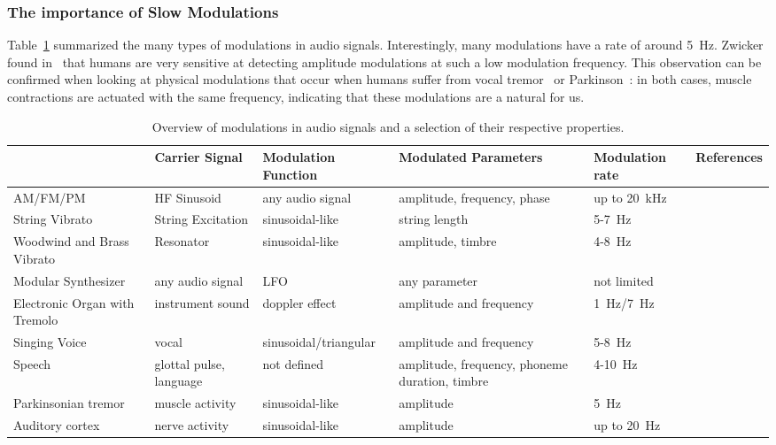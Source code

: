 \subsubsection*{The importance of Slow Modulations}

Table~\ref{tab:modulations} summarized the many types of modulations in audio signals.
Interestingly, many modulations have a rate of around 5~\si{\hertz}. 
Zwicker found in~\cite{zwicker52} that humans are very sensitive at detecting amplitude modulations at such a low modulation frequency.
This observation can be confirmed when looking at physical modulations that occur when humans suffer from vocal tremor~\cite{ramig87} or Parkinson~\cite{botzel14}: in both cases, muscle contractions are actuated with the same frequency, indicating that these modulations are a natural for us.

\begin{table}[]
\scriptsize
\centering
\begin{adjustbox}{angle=90}
\begin{tabular}{@{}lllp{3.5cm}ll@{}}
\toprule
                          & Carrier Signal    & Modulation Function & Modulated Parameters        & Modulation rate & References\\ 
\midrule
AM/FM/PM                  & HF Sinusoid       & any audio signal    & amplitude, frequency, phase & up to 20~\si{\kilo\hertz}     & \cite{shannon48}        \\
String Vibrato & String Excitation & sinusoidal-like     & string length   & 5-7~\si{\hertz}          & \cite{fletcher01, macleod06}\\
Woodwind and Brass Vibrato & Resonator & sinusoidal-like & amplitude, timbre               & 4-8~\si{\hertz}          & \cite{fletcher01, gilbert05}\\
Modular Synthesizer       & any audio signal  & LFO                 & any parameter               & not limited     & \cite{buchla05, pinch09}\\ 
Electronic Organ with Tremolo  & instrument sound & doppler effect      & amplitude and frequency & 1~\si{\hertz}/7~\si{\hertz} & \cite{leslie49} \\
Singing Voice  & vocal &  sinusoidal/triangular &  amplitude and frequency & 5-8~\si{\hertz} & \cite{sundberg94} \\
Speech  & glottal pulse, language & not defined & amplitude, frequency, \newline phoneme duration, timbre& 4-10~\si{\hertz} & \cite{plomp83, fuellgrabe09}\\
Parkinsonian tremor  & muscle activity &  sinusoidal-like & amplitude & 5~\si{\hertz} & \cite{botzel14}\\
Auditory cortex  & nerve activity &  sinusoidal-like & amplitude & up to 20~\si{\hertz} & \cite{schreiner88}\\
\bottomrule
\end{tabular}
\end{adjustbox}
\caption{Overview of modulations in audio signals and a selection of their respective properties.}%
\label{tab:modulations}
\end{table}

